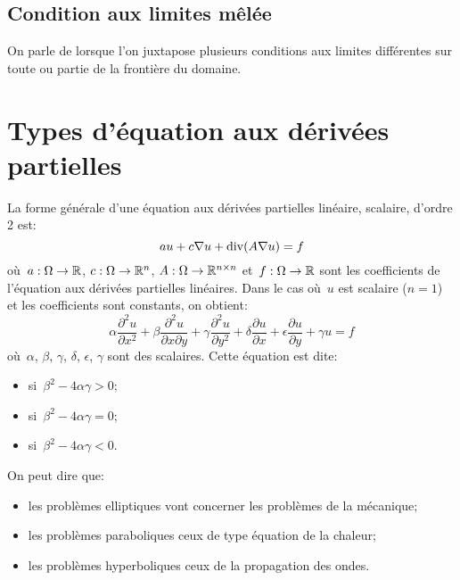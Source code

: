 \medskip
\subsection{Condition aux limites mêlée}
On parle de  lorsque l'on juxtapose plusieurs conditions aux limites différentes sur toute ou partie de la frontière du domaine.

\medskip
\section{Types d'équation aux dérivées partielles}
La forme générale d'une équation aux dérivées partielles linéaire, scalaire, d'ordre 2 est:
\begin{equation}
au + c \nabla u + \operatorname{div} (A\nabla u) = f
\end{equation}
où~$a: \Omega\rightarrow\mathbb R$, $c: \Omega\rightarrow\mathbb R^n$, 
$A: \Omega\rightarrow\mathbb R^{n\times n}$ et~$f: \Omega\rightarrow\mathbb R$ sont les coefficients de l'équation aux dérivées partielles linéaires.
\medskipvm
Dans le cas où~$u$ est scalaire ($n = 1$) et les coefficients sont constants, on obtient:
\begin{equation}
\alpha\dfrac{\partial^2 u}{\partial x^2}+\beta\dfrac{\partial^2 u}{\partial x\partial y}
+\gamma \dfrac{\partial^2 u}{\partial y^2} + \delta \dfrac{\partial u}{\partial x}
+ \epsilon \dfrac{\partial u}{\partial y} +\gamma u = f
\end{equation}
où~$\alpha$, $\beta$, $\gamma$, $\delta$, $\epsilon$, $\gamma$ sont des scalaires.
Cette équation est dite:
\begin{itemize}
  \item {} si~$\beta^2-4\alpha\gamma>0$;
  \item {} si~$\beta^2-4\alpha\gamma=0$;
  \item {} si~$\beta^2-4\alpha\gamma<0$.
\end{itemize}

\medskip
{}
On peut dire que:
\begin{itemize}
  \item les problèmes elliptiques vont concerner les problèmes de la mécanique;
  \item les problèmes paraboliques ceux de type équation de la chaleur;
  \item les problèmes hyperboliques ceux de la propagation des ondes.
\end{itemize}

